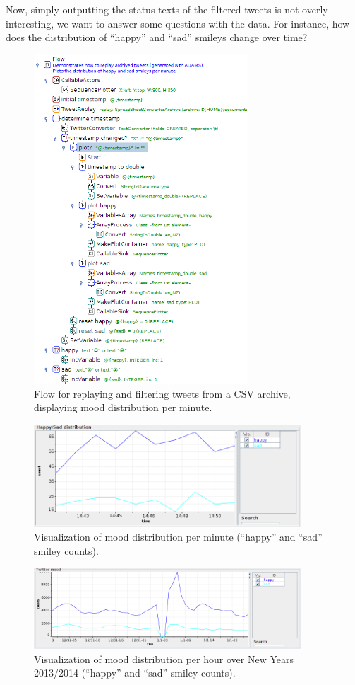 \documentclass[a4paper,10pt]{book}
\begin{document}
Now, simply outputting the status texts of the filtered tweets is not overly interesting, we want to answer some questions with the data. For instance, how does the distribution of ``happy'' and ``sad'' smileys change over time?

\begin{figure}[htb]
  \centering
  \includegraphics[width=8.0cm]{images/replay_and_filter_tweets2-flow.png}
  \caption{Flow for replaying and filtering tweets from a CSV archive, displaying mood distribution per minute.}
  \label{replay_and_filter_tweets2-flow}
\end{figure}

\begin{figure}[htb]
  \centering
  \includegraphics[width=10.0cm]{images/replay_and_filter_tweets2-output.png}
  \caption{Visualization of mood distribution per minute (``happy'' and ``sad'' smiley counts).}
  \label{replay_and_filter_tweets2-output}
\end{figure}

\begin{figure}[htb]
  \centering
  \includegraphics[width=10.0cm]{images/twitter_mood.png}
  \caption{Visualization of mood distribution per hour over New Years 2013/2014 (``happy'' and ``sad'' smiley counts).}
  \label{twitter_mood}
\end{figure}
\end{document}
